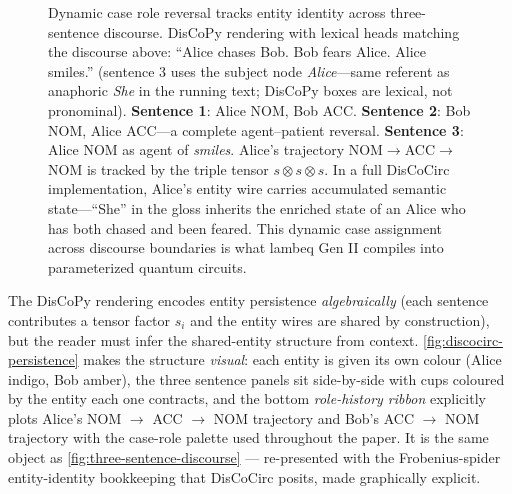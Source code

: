 \documentclass[
]{article}
\makeatletter
\newcommand*\pandocbounded[1]{%
  \sbox\pandoc@box{#1}%
  \Gscale@div\@tempa{\textheight}{\dimexpr\ht\pandoc@box+\dp\pandoc@box\relax}%
  \Gscale@div\@tempb{\linewidth}{\wd\pandoc@box}%
  \ifdim\@tempb\p@<\@tempa\p@\let\@tempa\@tempb\fi%
  \ifdim\@tempa\p@<\p@\scalebox{\@tempa}{\usebox\pandoc@box}%
  \else\usebox{\pandoc@box}%
  \fi%
}
\makeatother
\begin{document}
\begin{figure}
\centering
\pandocbounded{\includegraphics[keepaspectratio,alt={Dynamic case role reversal tracks entity identity across three-sentence discourse. DisCoPy rendering with lexical heads matching the discourse above: ``Alice chases Bob. Bob fears Alice. Alice smiles.'' (sentence 3 uses the subject node ---same referent as anaphoric  in the running text; DisCoPy boxes are lexical, not pronominal). Sentence 1: Alice NOM, Bob ACC. Sentence 2: Bob NOM, Alice ACC---a complete agent--patient reversal. Sentence 3: Alice NOM as agent of . Alice's trajectory NOM\textbackslash toACC\textbackslash toNOM is tracked by the triple tensor s \textbackslash otimes s \textbackslash otimes s. In a full DisCoCirc implementation, Alice's entity wire carries accumulated semantic state---``She'' in the gloss inherits the enriched state of an Alice who has both chased and been feared. This dynamic case assignment across discourse boundaries is what lambeq Gen II \[@lambeq2025genii\] compiles into parameterized quantum circuits.}]{../figures/discopy_three_sentence_discourse.png}}
\caption{Dynamic case role reversal tracks entity identity across
three-sentence discourse. DisCoPy rendering with lexical heads matching
the discourse above: ``Alice chases Bob. Bob fears Alice. Alice
smiles.'' (sentence 3 uses the subject node \emph{Alice}---same referent
as anaphoric \emph{She} in the running text; DisCoPy boxes are lexical,
not pronominal). \textbf{Sentence 1}: Alice NOM, Bob ACC.
\textbf{Sentence 2}: Bob NOM, Alice ACC---a complete agent--patient
reversal. \textbf{Sentence 3}: Alice NOM as agent of \emph{smiles}.
Alice's trajectory NOM\(\to\)ACC\(\to\)NOM is tracked by the triple
tensor \(s \otimes s \otimes s\). In a full DisCoCirc implementation,
Alice's entity wire carries accumulated semantic state---``She'' in the
gloss inherits the enriched state of an Alice who has both chased and
been feared. This dynamic case assignment across discourse boundaries is
what lambeq Gen II \citep{lambeq2025genii} compiles into parameterized
quantum circuits.}\label{fig:three-sentence-discourse}
\end{figure}

The DisCoPy rendering encodes entity persistence \emph{algebraically}
(each sentence contributes a tensor factor \(s_i\) and the entity wires
are shared by construction), but the reader must infer the shared-entity
structure from context. \autoref{fig:discocirc-persistence} makes the
structure \emph{visual}: each entity is given its own colour (Alice
indigo, Bob amber), the three sentence panels sit side-by-side with cups
coloured by the entity each one contracts, and the bottom
\emph{role-history ribbon} explicitly plots Alice's NOM \(\to\) ACC
\(\to\) NOM trajectory and Bob's ACC \(\to\) NOM trajectory with the
case-role palette used throughout the paper. It is the same object as
\autoref{fig:three-sentence-discourse} --- re-presented with the
Frobenius-spider entity-identity bookkeeping that DisCoCirc posits, made
graphically explicit.
\end{document}
